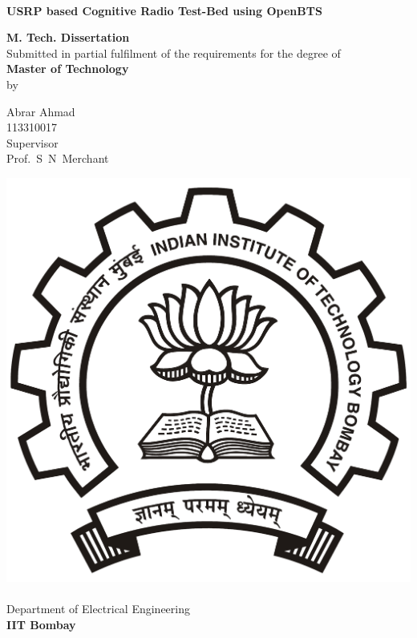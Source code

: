 \begin{titlepage}
\begin{center}
\begin{spacing}{1.0}


~\\[0.3cm]
{ \LARGE \bfseries USRP based Cognitive Radio Test-Bed using OpenBTS\\[1.2cm] }

\textbf{\large M. Tech. Dissertation}\\[1.2cm]

{Submitted in partial fulfilment of the requirements for the degree of\\[0.1cm]
\textbf{Master of Technology}\\[0.3cm]
by\\[0.3cm]}

{\LARGE Abrar Ahmad\\[0.1cm]}
{113310017\\[1.4cm]}
{Supervisor\\[0.1cm]}
{\LARGE Prof.~S~N~Merchant\\[2cm]}

\includegraphics[width=0.21\textheight]{../images/iitbLogo}~\\[0.9cm]
Department of Electrical Engineering\\[0.2cm]
\textbf{\large IIT Bombay}\\[1.3cm]


\end{spacing}
\end{center}
\end{titlepage}
